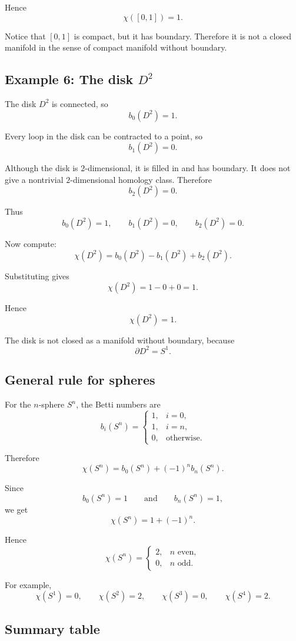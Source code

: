 \documentclass[12pt,a4paper]{article}
\theoremstyle{notespace}
\begin{document}
Hence
\[
\boxed{\chi([0,1])=1.}
\]

Notice that $[0,1]$ is compact, but it has boundary. Therefore it is not a
closed manifold in the sense of compact manifold without boundary.

\subsection{Example 6: The disk $D^2$}

The disk $D^2$ is connected, so
\[
b_0(D^2)=1.
\]

Every loop in the disk can be contracted to a point, so
\[
b_1(D^2)=0.
\]

Although the disk is $2$-dimensional, it is filled in and has boundary. It does
not give a nontrivial $2$-dimensional homology class. Therefore
\[
b_2(D^2)=0.
\]

Thus
\[
b_0(D^2)=1,
\qquad
b_1(D^2)=0,
\qquad
b_2(D^2)=0.
\]

Now compute:
\[
\chi(D^2)
=
b_0(D^2)-b_1(D^2)+b_2(D^2).
\]

Substituting gives
\[
\chi(D^2)=1-0+0=1.
\]

Hence
\[
\boxed{\chi(D^2)=1.}
\]

The disk is not closed as a manifold without boundary, because
\[
\partial D^2=S^1.
\]

\subsection{General rule for spheres}

For the $n$-sphere $S^n$, the Betti numbers are
\[
b_i(S^n)
=
\begin{cases}
	1, & i=0,\\
	1, & i=n,\\
	0, & \text{otherwise}.
\end{cases}
\]

Therefore
\[
\chi(S^n)
=
b_0(S^n)+(-1)^n b_n(S^n).
\]

Since
\[
b_0(S^n)=1
\qquad
\text{and}
\qquad
b_n(S^n)=1,
\]
we get
\[
\chi(S^n)=1+(-1)^n.
\]

Hence
\[
\chi(S^n)
=
\begin{cases}
	2, & n \text{ even},\\
	0, & n \text{ odd}.
\end{cases}
\]

For example,
\[
\chi(S^1)=0,
\qquad
\chi(S^2)=2,
\qquad
\chi(S^3)=0,
\qquad
\chi(S^4)=2.
\]

\subsection{Summary table}
\end{document}
